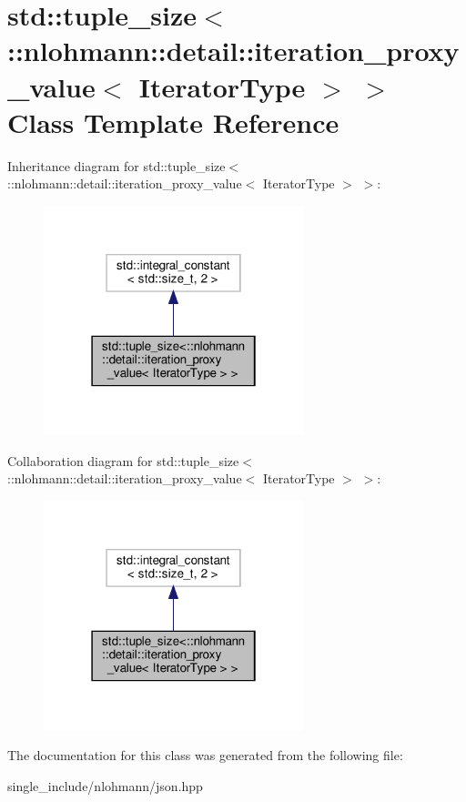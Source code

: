 \hypertarget{classstd_1_1tuple__size_3_1_1nlohmann_1_1detail_1_1iteration__proxy__value_3_01IteratorType_01_4_01_4}{}\section{std\+:\+:tuple\+\_\+size$<$\+:\+:nlohmann\+:\+:detail\+:\+:iteration\+\_\+proxy\+\_\+value$<$ Iterator\+Type $>$ $>$ Class Template Reference}
\label{classstd_1_1tuple__size_3_1_1nlohmann_1_1detail_1_1iteration__proxy__value_3_01IteratorType_01_4_01_4}


Inheritance diagram for std\+:\+:tuple\+\_\+size$<$\+:\+:nlohmann\+:\+:detail\+:\+:iteration\+\_\+proxy\+\_\+value$<$ Iterator\+Type $>$ $>$\+:\nopagebreak
\begin{figure}[H]
\begin{center}
\leavevmode
\includegraphics[width=214pt]{classstd_1_1tuple__size_3_1_1nlohmann_1_1detail_1_1iteration__proxy__value_3_01IteratorType_01_4_01_4__inherit__graph}
\end{center}
\end{figure}


Collaboration diagram for std\+:\+:tuple\+\_\+size$<$\+:\+:nlohmann\+:\+:detail\+:\+:iteration\+\_\+proxy\+\_\+value$<$ Iterator\+Type $>$ $>$\+:\nopagebreak
\begin{figure}[H]
\begin{center}
\leavevmode
\includegraphics[width=214pt]{classstd_1_1tuple__size_3_1_1nlohmann_1_1detail_1_1iteration__proxy__value_3_01IteratorType_01_4_01_4__coll__graph}
\end{center}
\end{figure}


The documentation for this class was generated from the following file\+:\begin{DoxyCompactItemize}
\item 
single\+\_\+include/nlohmann/json.\+hpp\end{DoxyCompactItemize}
